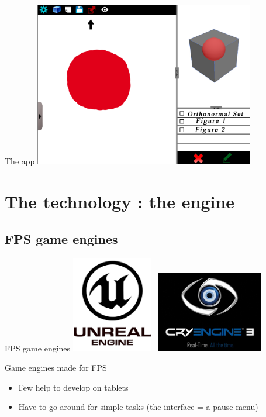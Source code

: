 \documentclass[a4paper,10pt]{beamer}
\begin{document}
			\begin{frame}{The app}
				\includegraphics[height=205pt]{maquette/maquette_8.png}
			\end{frame}
	
	\section{The technology : the engine}
			
		\subsection{FPS game engines}
		
			\begin{frame}{FPS game engines}
				\includegraphics[height=120pt]{images/logos/Unreal_Engine.png}  \mbox{     }\includegraphics[height=100pt]{images/logos/Cry_Engine.png}
				
				Game engines made for FPS
				\begin{itemize}
					\item Few help to develop on tablets
					\item Have to go around for simple tasks (the interface = a pause menu)
				\end{itemize}
			\end{frame}
			
\end{document}
